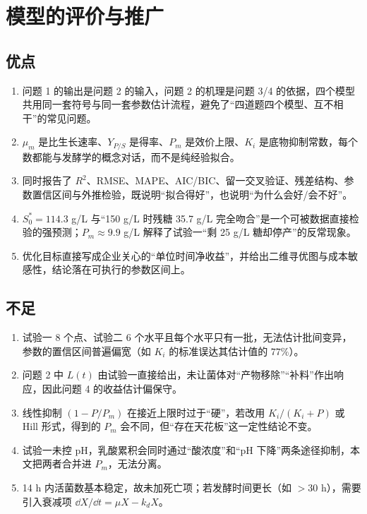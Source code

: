\section{模型的评价与推广}

\subsection{优点}
\begin{enumerate}[leftmargin=2.2em,itemsep=0.12em]
\item {}问题 1 的输出是问题 2 的输入，问题 2 的机理是问题 3/4 的依据，四个模型共用同一套符号与同一套参数估计流程，避免了“四道题四个模型、互不相干”的常见问题。
\item {}$\mu_m$ 是比生长速率、$Y_{P/S}$ 是得率、$P_m$ 是效价上限、$K_i$ 是底物抑制常数，每个数都能与发酵学的概念对话，而不是纯经验拟合。
\item {}同时报告了 $R^2$、RMSE、MAPE、AIC/BIC、留一交叉验证、残差结构、参数置信区间与外推检验，既说明“拟合得好”，也说明“为什么会好/会不好”。
\item {}$S_0^*=114.3$ g/L 与“150 g/L 时残糖 35.7 g/L 完全吻合”是一个可被数据直接检验的强预测；$P_m\approx9.9$ g/L 解释了试验一“剩 25 g/L 糖却停产”的反常现象。
\item {}优化目标直接写成企业关心的“单位时间净收益”，并给出二维寻优图与成本敏感性，结论落在可执行的参数区间上。
\end{enumerate}

\subsection{不足}
\begin{enumerate}[leftmargin=2.2em,itemsep=0.12em]
\item {}试验一 8 个点、试验二 6 个水平且每个水平只有一批，无法估计批间变异，参数的置信区间普遍偏宽（如 $K_i$ 的标准误达其估计值的 $77\%$）。
\item {}问题 2 中 $L(t)$ 由试验一直接给出，未让菌体对“产物移除”“补料”作出响应，因此问题 4 的收益估计偏保守。
\item {}线性抑制 $(1-P/P_m)$ 在接近上限时过于“硬”，若改用 $K_i/(K_i+P)$ 或 Hill 形式，得到的 $P_m$ 会不同，但“存在天花板”这一定性结论不变。
\item {}试验一未控 pH，乳酸累积会同时通过“酸浓度”和“pH 下降”两条途径抑制，本文把两者合并进 $P_m$，无法分离。
\item {}14 h 内活菌数基本稳定，故未加死亡项；若发酵时间更长（如 $>30$ h），需要引入衰减项 $\dd X/\dd t=\mu X-k_dX$。
\end{enumerate}

